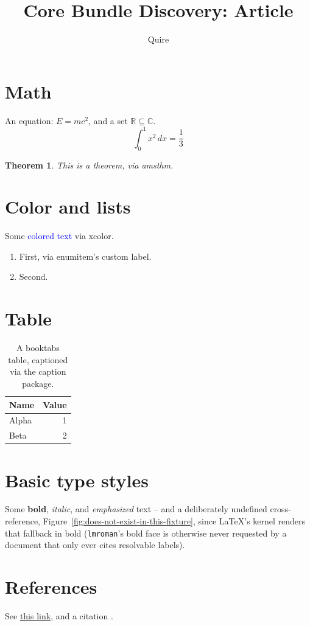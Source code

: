 \documentclass{article}
\title{Core Bundle Discovery: Article}
\author{Quire}
\newtheorem{theorem}{Theorem}
\begin{document}
\maketitle

\section{Math}
An equation: $E = mc^2$, and a set $\mathbb{R} \subseteq \mathbb{C}$.
\begin{equation}
  \int_0^1 x^2 \, dx = \frac{1}{3}
\end{equation}

\begin{theorem}
  This is a theorem, via amsthm.
\end{theorem}

\section{Color and lists}
Some \textcolor{blue}{colored text} via xcolor.

\begin{enumerate}[label=(\alph*)]
  \item First, via enumitem's custom label.
  \item Second.
\end{enumerate}

\section{Table}
\begin{table}
  \centering
  \caption{A booktabs table, captioned via the caption package.}
  \begin{tabular}{lr}
    \toprule
    Name & Value \\
    \midrule
    Alpha & 1 \\
    Beta & 2 \\
    \bottomrule
  \end{tabular}
\end{table}

\section{Basic type styles}
Some \textbf{bold}, \textit{italic}, and \emph{emphasized} text -- and a deliberately
undefined cross-reference, Figure~\ref{fig:does-not-exist-in-this-fixture}, since LaTeX's
kernel renders that fallback in bold (\texttt{lmroman}'s bold face is otherwise never
requested by a document that only ever cites resolvable labels).

\section{References}
See \href{https://example.com}{this link}, and a citation \citep{knuth1984}.



\end{document}

